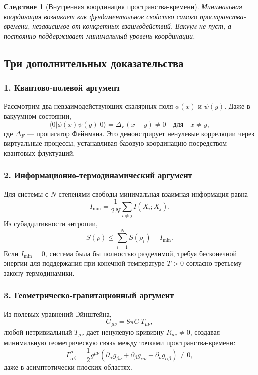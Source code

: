 \documentclass[11pt,a4paper]{article}
\newtheorem{corollary}{Следствие}
\begin{document}
	\begin{corollary}[Внутренняя координация пространства-времени]
		Минимальная координация возникает как фундаментальное свойство самого пространства-времени, независимое от конкретных взаимодействий. Вакуум не пуст, а постоянно поддерживает минимальный уровень координации.
	\end{corollary}
	
	\subsection{Три дополнительных доказательства}
	
	\subsubsection*{1. Квантово-полевой аргумент}
	Рассмотрим два невзаимодействующих скалярных поля \(\phi(x)\) и \(\psi(y)\).
	Даже в вакуумном состоянии,
	\[
	\langle 0 | \phi(x) \psi(y) | 0 \rangle = \Delta_F(x-y) \neq 0 \quad
	\text{для} \quad x \neq y,
	\]
	где \(\Delta_F\) — пропагатор Фейнмана. Это демонстрирует ненулевые
	корреляции через виртуальные процессы, устанавливая базовую
	координацию посредством квантовых флуктуаций.
	
	\subsubsection*{2. Информационно-термодинамический аргумент}
	Для системы с \(N\) степенями свободы минимальная взаимная информация
	равна
	\[
	I_{\min} = \frac{1}{2N} \sum_{i \neq j} I(X_i; X_j).
	\]
	Из субаддитивности энтропии,
	\[
	S(\rho) \leq \sum_{i=1}^N S(\rho_i) - I_{\min}.
	\]
	Если \(I_{\min}=0\), система была бы полностью разделимой, требуя
	бесконечной энергии для поддержания при конечной температуре \(T>0\) согласно
	третьему закону термодинамики.
	
	\subsubsection*{3. Геометрическо-гравитационный аргумент}
	Из полевых уравнений Эйнштейна,
	\[
	G_{\mu\nu} = 8\pi G \, T_{\mu\nu},
	\]
	любой нетривиальный \(T_{\mu\nu}\) дает ненулевую кривизну \(R_{\mu\nu} \neq 0\),
	создавая минимальную геометрическую связь между точками пространства-времени:
	\[
	\Gamma^{\mu}_{\alpha\beta} = \frac{1}{2} g^{\mu\nu}(\partial_\alpha g_{\beta\nu}
	+ \partial_\beta g_{\alpha\nu} - \partial_\nu g_{\alpha\beta}) \neq 0,
	\]
	даже в асимптотически плоских областях.
	
\end{document}

